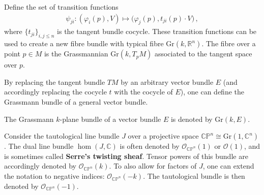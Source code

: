     \begin{construct}\label{bundle:grassmann_bundle}
        Define the set of transition functions
        \begin{gather}
            \psi_{ji}:(\varphi_i(p),V)\mapsto\bigl(\varphi_j(p),t_{ji}(p)\cdot V\bigr)\,,
        \end{gather}
        where $\{t_{ji}\}_{i,j\leq n}$ is the tangent bundle cocycle. These transition functions can be used to create a new fibre bundle with typical fibre $\mathrm{Gr}(k,\mathbb{R}^n)$. The fibre over a point $p\in M$ is the Grassmannian $\mathrm{Gr}(k,T_pM)$ associated to the tangent space over $p$.

        By replacing the tangent bundle $TM$ by an arbitrary vector bundle $E$ (and accordingly replacing the cocycle $t$ with the cocycle of $E$), one can define the Grassmann bundle of a general vector bundle.
    \end{construct}
    \begin{notation}
        The Grassmann $k$-plane bundle of a vector bundle $E$ is denoted by $\mathrm{Gr}(k,E)$.
    \end{notation}


    \begin{definition}
        Consider the tautological line bundle $J$ over a projective space $\mathbb{C}\mathbb{P}^n\cong\mathrm{Gr}(1,\mathbb{C}^n)$. The dual line bundle $\hom(J,\mathbb{C})$ is often denoted by $\mathcal{O}_{\mathbb{CP}^n}(1)$ or $\mathcal{O}(1)$, and is sometimes called \textbf{Serre's twisting sheaf}. Tensor powers of this bundle are accordingly denoted by $\mathcal{O}_{\mathbb{CP}^n}(k)$. To also allow for factors of $J$, one can extend the notation to negative indices: $\mathcal{O}_{\mathbb{CP}^n}(-k)$. The tautological bundle is then denoted by $\mathcal{O}_{\mathbb{CP}^n}(-1)$.
    \end{definition}

